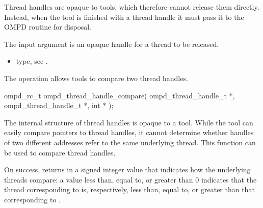 \descr
Thread handles are opaque to tools, which therefore cannot release them directly.
Instead, when the tool is finished with a thread handle it must pass it to the OMPD 
 routine for disposal.

\argdesc
The input argument  is an opaque handle for a thread
to be released.

\crossreferences
\begin{itemize}
	\item {} type, see .
\end{itemize}


\label{subsubsubsec:ompd_thread_handle_compare}
\summary
The  operation allows tools to compare 
two thread handles.

\format

\begin{cspecific}
\begin{ompSyntax}
ompd_rc_t ompd_thread_handle_compare(
  ompd_thread_handle_t *,
  ompd_thread_handle_t *,
  int *
);
\end{ompSyntax}
\end{cspecific}


\descr
The internal structure of thread handles is opaque to a tool. While the tool can easily compare 
pointers to thread handles, it cannot determine whether handles of two different addresses
refer to the same underlying thread. This function can be used to compare thread handles.

On success,  returns in  a signed 
integer value that indicates how the underlying threads compare: a value less than, equal to, or 
greater than 0 indicates that the thread corresponding to  is, respectively, 
less than, equal to, or greater than that corresponding to .


%


